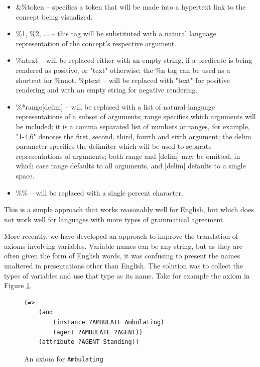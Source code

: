 \documentclass{book}
\begin{document}
\begin{itemize}

\item \&\%token – specifies a token that will be made into a hypertext link to
the concept being visualized.

\item \%1, \%2, ... – this tag will be substituted with a natural language
representation of the concept’s respective argument.

\item \%n{text} – will be replaced either with an empty string, if a predicate
is being rendered as positive, or "text" otherwise; the \%n tag can be used as a
shortcut for \%n{not}. \%p{text} – will be replaced with "text" for positive
rendering and with an empty string for negative rendering.

\item \%*{range}[delim] – will be replaced with a list of natural-language
representations of a subset of arguments; range specifies which arguments will
be included; it is a comma separated list of numbers or ranges, for example,
"1-4,6" denotes the first, second, third, fourth and sixth argument; the
delim parameter specifies the delimiter which will be used to separate
representations of arguments; both {range} and [delim] may be omitted, in which
case {range} defaults to all arguments, and [delim] defaults to a single space.

\item \%\% – will be replaced with a single percent character.
\end{itemize}

This is a simple approach that works reasonably well for English, but which does
not work well for languages with more types of grammatical agreement.

More recently, we have developed an approach to improve the translation of
axioms involving variables.  Variable names can be any string, but as they are
often given the form of English words, it was confusing to present the names
unaltered in presentations other than English. The solution was to collect the
types of variables and use that type as its name.  Take for example the axiom in
Figure \ref{fig:Ambulating}.

\begin{figure}
\begin{framed}
\label{fig:Ambulating}
\begin{verbatim}
(=> 
    (and 
        (instance ?AMBULATE Ambulating) 
        (agent ?AMBULATE ?AGENT)) 
    (attribute ?AGENT Standing)) 
\end{verbatim}
\caption{An axiom for {\tt Ambulating}}
\end{framed}
\end{figure}
\end{document}
